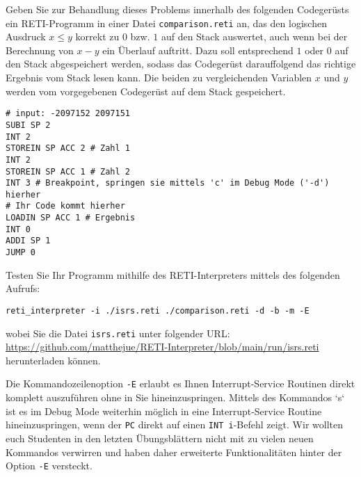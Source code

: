 \documentclass{article}
\begin{document}
Geben Sie zur Behandlung dieses Problems innerhalb des folgenden Codegerüsts ein RETI-Programm in einer Datei \verb|comparison.reti| an, das den logischen Ausdruck $x \le y$ korrekt zu $0$ bzw. $1$ auf den Stack auswertet, auch wenn bei der Berechnung von $x - y$ ein Überlauf auftritt. Dazu soll entsprechend $1$ oder $0$ auf den Stack abgespeichert werden, sodass das Codegerüst darauffolgend das richtige Ergebnis vom Stack lesen kann. Die beiden zu vergleichenden Variablen $x$ und $y$ werden vom vorgegebenen Codegerüst auf dem Stack gespeichert. %

\begin{verbatim}
# input: -2097152 2097151
SUBI SP 2
INT 2
STOREIN SP ACC 2 # Zahl 1
INT 2
STOREIN SP ACC 1 # Zahl 2
INT 3 # Breakpoint, springen sie mittels 'c' im Debug Mode ('-d') hierher
# Ihr Code kommt hierher
LOADIN SP ACC 1 # Ergebnis
INT 0
ADDI SP 1
JUMP 0
\end{verbatim}

Testen Sie Ihr Programm mithilfe des RETI-Interpreters mittels des folgenden Aufrufs:

\begin{verbatim}
reti_interpreter -i ./isrs.reti ./comparison.reti -d -b -m -E
\end{verbatim}

wobei Sie die Datei \verb|isrs.reti| unter folgender URL: \href{https://github.com/matthejue/RETI-Interpreter/blob/main/run/isrs.reti}{https://github.com/matthejue/RETI-Interpreter/blob/main/run/isrs.reti} herunterladen können.

Die Kommandozeilenoption \verb|-E| erlaubt es Ihnen Interrupt-Service Routinen direkt komplett auszuführen ohne in Sie hineinzuspringen. Mittels des Kommandos `s` ist es im Debug Mode weiterhin möglich in eine Interrupt-Service Routine hineinzuspringen, wenn der \verb|PC| direkt auf einen \verb|INT i|-Befehl zeigt. Wir wollten euch Studenten in den letzten Übungsblättern nicht mit zu vielen neuen Kommandos verwirren und haben daher erweiterte Funktionalitäten hinter der Option \verb|-E| versteckt.
\end{document}
